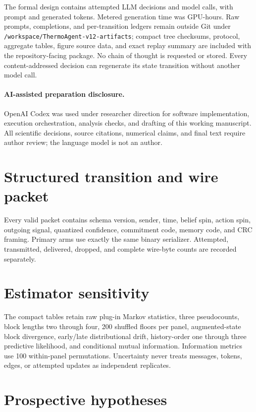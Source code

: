 \documentclass[12pt]{article}
\begin{document}
The formal design contains \VDecisionRows{} attempted LLM decisions and
\VModelCalls{} model calls, with \VPromptTokens{} prompt and
\VGeneratedTokens{} generated tokens. Metered generation time was
\VGPUHours{} GPU-hours. Raw prompts, completions, and per-transition ledgers
remain outside Git under \texttt{/workspace/ThermoAgent-v12-artifacts}; compact
tree checksums, protocol, aggregate tables, figure source data, and exact replay
summary are included with the repository-facing package. No chain of thought is
requested or stored. Every content-addressed decision can regenerate its state
transition without another model call.

\paragraph{AI-assisted preparation disclosure.}
OpenAI Codex was used under researcher direction for software implementation,
execution orchestration, analysis checks, and drafting of this working
manuscript. All scientific decisions, source citations, numerical claims, and
final text require author review; the language model is not an author.

\appendix
\section{Structured transition and wire packet}

Every valid packet contains schema version, sender, time, belief spin, action
spin, outgoing signal, quantized confidence, commitment code, memory code, and
CRC framing. Primary arms use exactly the same binary serializer. Attempted,
transmitted, delivered, dropped, and complete wire-byte counts are recorded
separately.

\section{Estimator sensitivity}

The compact tables retain raw plug-in Markov statistics, three pseudocounts,
block lengths two through four, 200 shuffled floors per panel, augmented-state
block divergence, early/late distributional drift, history-order one through
three predictive likelihood, and conditional mutual information. Information
metrics use 100 within-panel permutations. Uncertainty never treats messages,
tokens, edges, or attempted updates as independent replicates.

\section{Prospective hypotheses}
\end{document}
